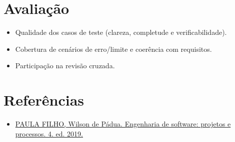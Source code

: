 \documentclass[12pt,a4paper]{article}
\begin{document}
\section{Avaliação}
\begin{itemize}[leftmargin=*,itemsep=0.25em]
  \item Qualidade dos casos de teste (clareza, completude e verificabilidade).
  \item Cobertura de cenários de erro/limite e coerência com requisitos.
  \item Participação na revisão cruzada.
\end{itemize}

\section{Referências}
\begin{itemize}[leftmargin=*,itemsep=0.25em]
  \item \href{../99-Materiais/Engenharia%20de%20software%20projetos%20e%20processos%20by%20Wilson%20de%20P%C3%A1dua%20Paula%20Filho%20.epub.pdf}{PAULA FILHO, Wilson de Pádua. Engenharia de software: projetos e processos. 4. ed. 2019.}
\end{itemize}
\end{document}
